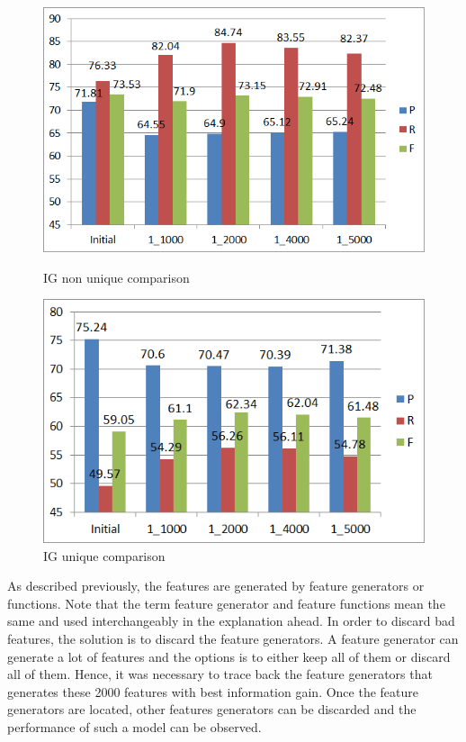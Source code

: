 \begin{figure}
\centering
\begin{minipage}{.5\textwidth}
  \centering
  \includegraphics[width=.95\textwidth]{figures/IGFirst5k_NU.png}
  \caption{IG non unique comparison}
  \label{fig:IG_5k_NU}
\end{minipage}%
\begin{minipage}{.5\textwidth}
  \centering
  \includegraphics[width=.95\textwidth]{figures/IGFirst5k_U.png}
  \caption{IG unique comparison}
  \label{fig:IG_5k_U}
\end{minipage}
\end{figure} 


As described previously, the features are generated by feature generators or functions. Note that the term feature generator and feature functions mean the same and used interchangeably in the explanation ahead. In order to discard bad features, the solution is to discard the feature generators. A feature generator can generate a lot of features and the options is to either keep all of them or discard all of them. Hence, it was necessary to trace back the feature generators that generates these 2000 features with best information gain. Once the feature generators are located, other features generators can be discarded and the performance of such a model can be observed.


